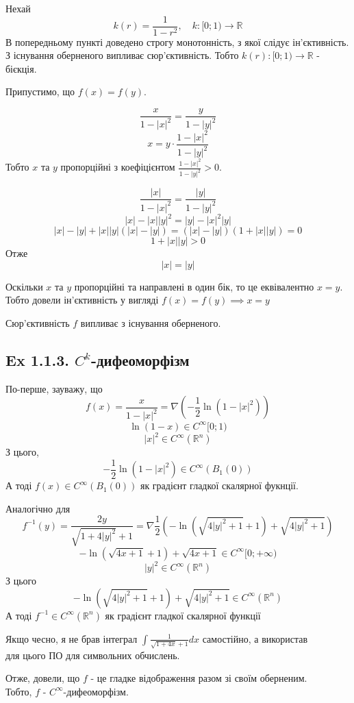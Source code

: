 \documentclass[10pt, a4paper]{article} %
\newcommand{\R}{\mathbb{R}}
\begin{document}
Нехай
\[k(r) = \frac{1}{1-r^2}, \quad k: [0;1) \to \R\]
В попередньому пункті доведено строгу монотонність, з якої слідує ін'єктивність.
З існування оберненого випливає сюр'єктивність.
Тобто $k(r) : [0;1) \to \R$ - бієкція.

Припустимо, що $f(x)=f(y)$.

\[\frac{x}{1-|x|^2} = \frac{y}{1-|y|^2}\]
\[x = y \cdot \frac{1-|x|^2}{1-|y|^2}\]
Тобто $x$ та $y$ пропорційні з коефіцієнтом $\frac{1-|x|^2}{1-|y|^2} > 0$.

\[\frac{|x|}{1-|x|^2} = \frac{|y|}{1-|y|^2}\]
\[|x|-|x||y|^2 = |y|-|x|^2|y|\]
\[|x|-|y|+|x||y|(|x|-|y|) = (|x|-|y|)(1+|x||y|) = 0\]
\[1 + |x||y| > 0\]
Отже
\[|x|=|y|\]

Оскільки $x$ та $y$ пропорційні та направлені в один бік, то це еквівалентно $x=y$.
Тобто довели ін'єктивність у вигляді $f(x)=f(y) \implies x=y$

Сюр'єктивність $f$ випливає з існування оберненого.

\subsection*{Ex 1.1.3. $C^k$-дифеоморфізм}
По-перше, зауважу, що 
\[f(x) = \frac{x}{1-|x|^2} = \nabla\left(-\frac{1}{2}\ln (1-|x|^2)\right)\]
\[\ln (1-x) \in C^\infty[0;1)\]
\[|x|^2 \in C^{\infty}(\R^n)\]
З цього, 
\[-\frac{1}{2}\ln (1-|x|^2) \in C^\infty(B_1(0))\]
А тоді $f(x) \in C^\infty(B_1(0))$ як градієнт гладкої скалярної фукнції.

Аналогічно для 
\[f^{-1}(y) = \frac{2y}{\sqrt{1+4|y|^2}+1} = \nabla\frac{1}{2}\left(-\ln(\sqrt{4|y|^2+1}+1)+\sqrt{4|y|^2+1}\right)\]
\[-\ln(\sqrt{4x+1}+1)+\sqrt{4x+1} \in C^\infty [0;+\infty)\]
\[|y|^2 \in C^{\infty}(\R^n)\]
З цього
\[-\ln(\sqrt{4|y|^2+1}+1)+\sqrt{4|y|^2+1} \in C^\infty(\R^n)\]
А тоді $f^{-1} \in C^\infty(\R^n)$ як градієнт гладкої скалярної функції

\begin{mdframed}
    Якщо чесно, я не брав інтеграл $\int \frac{1}{\sqrt{1+4x} + 1} dx$ самостійно, 
    а використав \\ для цього ПО для символьних обчислень.
\end{mdframed}

Отже, довели, що $f$ - це гладке відображення разом зі своїм оберненим.\\
Тобто, $f$ - $C^\infty$-дифеоморфізм.
\end{document}
